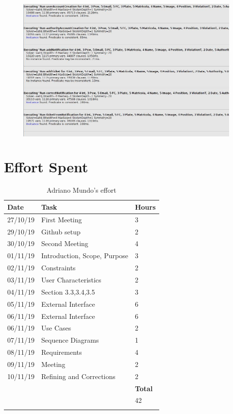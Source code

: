 \documentclass {article}
\begin{document}
		\begin{figure}[H]
			\centering
			\includegraphics[scale=0.55]{Images/Alloy/executing.jpg}
		\end{figure}
	

\section{Effort Spent}

\begin{longtable}{| p{2 cm} | p{6 cm} | p{1 cm} |} 
			\hline
			{\bf Date} & {\bf Task} & {\bf Hours}\\
			\hline
			27/10/19 & First Meeting & 3 \\
			\hline
			29/10/19 & Github setup & 2 \\
			\hline
			30/10/19 & Second Meeting & 4 \\
			\hline
			01/11/19 & Introduction, Scope, Purpose & 3 \\
			\hline
			02/11/19 & Constraints & 2 \\
			\hline
			03/11/19 & User Characteristics & 2 \\
			\hline
			04/11/19 & Section 3.3,3.4,3.5 & 3 \\
			\hline
			05/11/19 & External Interface & 6 \\
			\hline
			06/11/19 & External Interface & 6 \\
			\hline
			06/11/19 & Use Cases & 2 \\
			\hline
			07/11/19 & Sequence Diagrams  & 1 \\
			\hline
			08/11/19 & Requirements & 4 \\
			\hline
			09/11/19 & Meeting & 2 \\
			\hline
			10/11/19 & Refining and Corrections & 2 \\
			\hline
			& & {\bf Total} \\
			\hline
			& & 42 \\
			\hline
			\caption{Adriano Mundo's effort} 
\end{longtable}
\end{document}
